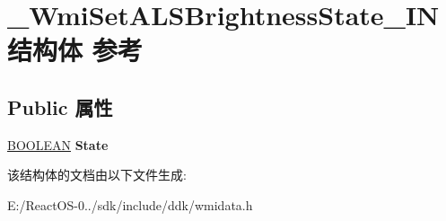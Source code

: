\hypertarget{struct___wmi_set_a_l_s_brightness_state___i_n}{}\section{\+\_\+\+Wmi\+Set\+A\+L\+S\+Brightness\+State\+\_\+\+I\+N结构体 参考}
\label{struct___wmi_set_a_l_s_brightness_state___i_n}
\subsection*{Public 属性}
\begin{DoxyCompactItemize}
\item 
\mbox{\label{struct___wmi_set_a_l_s_brightness_state___i_n_aad95a20bc8285c329206db7a37657094}} 
\hyperlink{_processor_bind_8h_a112e3146cb38b6ee95e64d85842e380a}{B\+O\+O\+L\+E\+AN} {\bfseries State}
\end{DoxyCompactItemize}


该结构体的文档由以下文件生成\+:\begin{DoxyCompactItemize}
\item 
E\+:/\+React\+O\+S-\/0../sdk/include/ddk/wmidata.\+h\end{DoxyCompactItemize}
